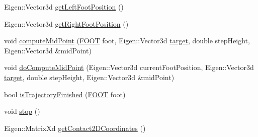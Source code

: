 \begin{DoxyCompactItemize}
\item 
\-Eigen\-::\-Vector3d \hyperlink{classStepController_aa168e028dc086859400e1c93c0becdd2}{get\-Left\-Foot\-Position} ()
\item 
\-Eigen\-::\-Vector3d \hyperlink{classStepController_aaa7e389226a30582be8c8a724661a921}{get\-Right\-Foot\-Position} ()
\item 
void \hyperlink{classStepController_a0dcf2ec0d0fdf1fd9d86878fffd4e5ad}{compute\-Mid\-Point} (\hyperlink{utils_8h_a4b6a8e135f90bd56e5a57a60efb42529}{\-F\-O\-O\-T} foot, \-Eigen\-::\-Vector3d \hyperlink{classStepController_a588d5b149eb4a6877e89ecff37d0f91d}{target}, double step\-Height, \-Eigen\-::\-Vector3d \&mid\-Point)
\item 
void \hyperlink{classStepController_a16b1f62737f1287b7f33b216871d1ba8}{do\-Compute\-Mid\-Point} (\-Eigen\-::\-Vector3d current\-Foot\-Position, \-Eigen\-::\-Vector3d \hyperlink{classStepController_a588d5b149eb4a6877e89ecff37d0f91d}{target}, double step\-Height, \-Eigen\-::\-Vector3d \&mid\-Point)
\item 
bool \hyperlink{classStepController_a9e2415755548f47301277feb7a376270}{is\-Trajectory\-Finished} (\hyperlink{utils_8h_a4b6a8e135f90bd56e5a57a60efb42529}{\-F\-O\-O\-T} foot)
\item 
void \hyperlink{classStepController_a48224628b92c088a34d9db4a14f75f1a}{stop} ()
\item 
\-Eigen\-::\-Matrix\-Xd \hyperlink{classStepController_afb77002292921660ef4a44657d6566f1}{get\-Contact2\-D\-Coordinates} ()
\end{DoxyCompactItemize}
